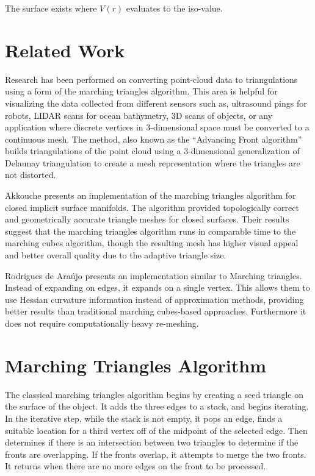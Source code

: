 \documentclass[conference]{acmsiggraph}
\begin{document}
The surface exists where $V(r)$ evaluates to the iso-value.


\section{Related Work}

Research has been performed on converting point-cloud data to triangulations
using a form of the marching triangles algorithm\cite{Scheidegger2005}. This
area is helpful for visualizing the data collected from different sensors
such as, ultrasound pings for robots, LIDAR scans for ocean bathymetry, 3D
scans of objects, or any application where discrete vertices in 3-dimensional
space must be converted to a continuous mesh. The method, also known as the
``Advancing Front algorithm'' builds triangulations of the point cloud using a
3-dimensional generalization of Delaunay triangulation to create a mesh
representation where the triangles are not distorted.

Akkouche presents an implementation of the marching triangles algorithm for
closed implicit surface manifolds\cite{Akkouche2001}. The algorithm provided
topologically correct and geometrically accurate triangle meshes for closed
surfaces. Their results suggest that the marching triangles algorithm runs in
comparable time to the marching cubes algorithm, though the resulting mesh has
higher visual appeal and better overall quality due to the adaptive triangle
size.

Rodrigues de Ara\'{u}jo presents an implementation similar to Marching
triangles. Instead of expanding on edges, it expands on a single
vertex\cite{DeAraujo2004}. This allows them to use Hessian curvature
information instead of approximation methods, providing better results than
traditional marching cubes-based approaches. Furthermore it does not require
computationally heavy re-meshing. 

\section{Marching Triangles Algorithm}
The classical marching triangles algorithm begins by creating a seed triangle
on the surface of the object. It adds the three edges to a stack, and begins
iterating. In the iterative step, while the stack is not empty, it pops an
edge, finds a suitable location for a third vertex off of the midpoint of the
selected edge. Then determines if there is an intersection between two
triangles to determine if the fronts are overlapping. If the fronts overlap, it
attempts to merge the two fronts. It returns when there are no more edges on
the front to be processed.
\end{document}
